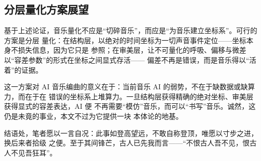 \documentclass[11pt,a4paper,fontset=none]{ctexart}
\begin{document}
\subsection{分层量化方案展望}

基于上述论证，音乐量化不应是“切碎音乐”，而应是“为音乐建立坐标系”。可行的方案是分层
量化：在结构层，以绝对的时间坐标为一切声音事件定位——坐标本身不损失信息，因为它只是
参照；在审美层，让不可量化的呼吸、偏移与微差以“容差参数”的形式在坐标之间显式存活——
偏差不再是错误，而是音乐得以“活着”的证据。

这一方案对 AI 音乐编曲的意义在于：当前音乐 AI 的弱势，不在于缺数据或缺算力，而在于在
错误的坐标系上堆算力。一旦结构层获得精确的绝对坐标、审美层获得显式的容差表达，AI 便
不再需要“模仿”音乐，而可以“书写”音乐。诚然，这仍是未竟的事业，本文不过为它提供一块
本体论的地基。

结语处，笔者愿以一言自况：此事如登高望远，不敢自称登顶，唯愿以寸步之进，换后来者拾级
之便。至于其间锋芒，古人已先我而言——“不恨古人吾不见，恨古人不见吾狂耳”。
\end{document}
